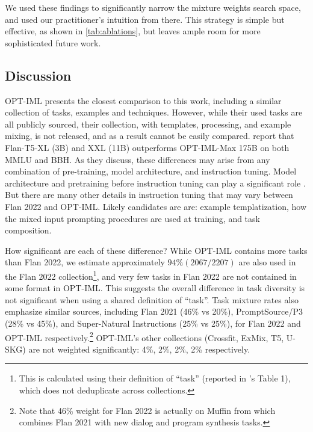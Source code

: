 We used these findings to significantly narrow the mixture weights search space, and used our practitioner's intuition from there. This strategy is simple but effective, as shown in \ref{tab:ablations}, but leaves ample room for more sophisticated future work.

\makeatletter
\newenvironment{customlegend3}[1][]{
    \begingroup

    \pgfplots@init@cleared@structures
    \pgfplotsset{#1}
}{

    \pgfplots@createlegend
    \endgroup
}

\def\csname pgfplots@addlegendimage\endcsname{\csname pgfplots@addlegendimage\endcsname}

\subsection{Discussion}
\label{sec:discussion}

OPT-IML \citep{iyer2022optiml} presents the closest comparison to this work, including a similar collection of tasks, examples and techniques. However, while their used tasks are all publicly sourced, their collection, with templates, processing, and example mixing, is not released, and as a result cannot be easily compared.
\citet{iyer2022optiml} report that Flan-T5-XL (3B) and XXL (11B) outperforms OPT-IML-Max 175B on both MMLU and BBH. As they discuss, these differences may arise from any combination of pre-training, model architecture, and instruction tuning. Model architecture and pretraining before instruction tuning can play a significant role \citep{wang2022language}. But there are many other details in instruction tuning that may vary between Flan 2022 and OPT-IML. Likely candidates are are: example templatization, how the mixed input prompting procedures are used at training, and task composition.

How significant are each of these difference? While OPT-IML contains more tasks than Flan 2022, we estimate approximately $94\% (2067 / 2207)$ are also used in the Flan 2022 collection\footnote{This is calculated using their definition of ``task'' (reported in \citet{iyer2022optiml}'s Table 1), which does not deduplicate across collections.}, and very few tasks in Flan 2022 are not contained in some format in OPT-IML. This suggests the overall difference in task diversity is not significant when using a shared definition of ``task''. Task mixture rates also emphasize similar sources, including Flan 2021 (46\% vs 20\%), PromptSource/P3 (28\% vs 45\%), and Super-Natural Instructions (25\% vs 25\%), for Flan 2022 and OPT-IML respectively.\footnote{Note that 46\% weight for Flan 2022 is actually on Muffin from \citet{chung2022scaling} which combines Flan 2021 with new dialog and program synthesis tasks.} OPT-IML's other collections (Crossfit, ExMix, T5, U-SKG) are not weighted significantly: 4\%, 2\%, 2\%, 2\% respectively.

